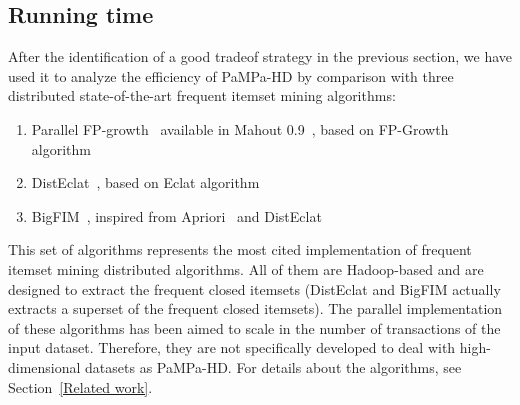 %
%
%
%


\subsection{Running time}\label{running_time}
After the identification of a good tradeof strategy in the previous section, we have used it to analyze the efficiency of PaMPa-HD
by comparison with three distributed state-of-the-art frequent itemset mining algorithms:
\begin{enumerate}
\item Parallel FP-growth~\cite{pfpgrowth} available in Mahout 0.9~\cite{Mahout}, based on FP-Growth algorithm~\cite{Han00}

\item DistEclat~\cite{bigfim}, based on Eclat algorithm~\cite{Zaki97newalgorithms}
\item BigFIM~\cite{bigfim}, inspired from Apriori~\cite{Agr94} and DistEclat
\end{enumerate}
This set of algorithms represents the most cited implementation of frequent itemset mining distributed algorithms. All of them are Hadoop-based and are designed to extract the frequent closed itemsets (DistEclat and BigFIM actually extracts a superset of the frequent closed itemsets).
The parallel implementation of these algorithms has been aimed to scale in the number of transactions of the input dataset. Therefore, they are not specifically developed to deal with
high-dimensional datasets as PaMPa-HD. 
For details about the algorithms, see Section~\ref{Related work}.

